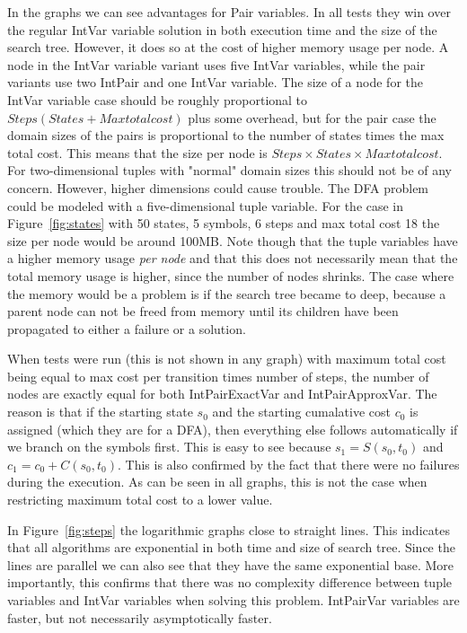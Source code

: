 \documentclass[a4paper,11pt]{article}
\begin{document}
In the graphs we can see advantages for Pair variables. In all tests they win over the regular IntVar variable solution in both execution time and the size of the search tree. However, it does so at the cost of higher memory usage per node. A node in the IntVar variable variant uses five IntVar variables, while the pair variants use two IntPair and one IntVar variable. The size of a node for the IntVar variable case should be roughly proportional to $Steps(States + Maxtotalcost)$ plus some overhead, but for the pair case the domain sizes of the pairs is proportional to the number of states times the max total cost. This means that the size per node is $Steps\times States\times Maxtotalcost$. For two-dimensional tuples with "normal" domain sizes this should not be of any concern. However, higher dimensions could cause trouble. The DFA problem could be modeled with a five-dimensional tuple variable. For the case in Figure~\ref{fig:states} with 50 states, 5 symbols, 6 steps and max total cost 18 the size per node would be around 100MB. Note though that the tuple variables have a higher memory usage \textit{per node} and that this does not necessarily mean that the total memory usage is higher, since the number of nodes shrinks. The case where the memory would be a problem is if the search tree became to deep, because a parent node can not be freed from memory until its children have been propagated to either a failure or a solution.

When tests were run (this is not shown in any graph) with maximum total cost being equal to max cost per transition times number of steps, the number of nodes are exactly equal for both IntPairExactVar and IntPairApproxVar. The reason is that if the starting state $s_0$ and the starting cumalative cost $c_0$ is assigned (which they are for a DFA), then everything else follows automatically if we branch on the symbols first. This is easy to see because $s_1=S(s_0, t_0)$ and $c_1=c_0+C(s_0, t_0)$. This is also confirmed by the fact that there were no failures during the execution. As can be seen in all graphs, this is not the case when restricting maximum total cost to a lower value.

In Figure~\ref{fig:steps} the logarithmic graphs  close to straight lines. This indicates that all algorithms are exponential in both time and size of search tree. Since the lines are parallel we can also see that they have the same exponential base. More importantly, this confirms that there was no complexity difference between tuple variables and IntVar variables when solving this problem. IntPairVar variables are faster, but not necessarily asymptotically faster. 
\end{document}

